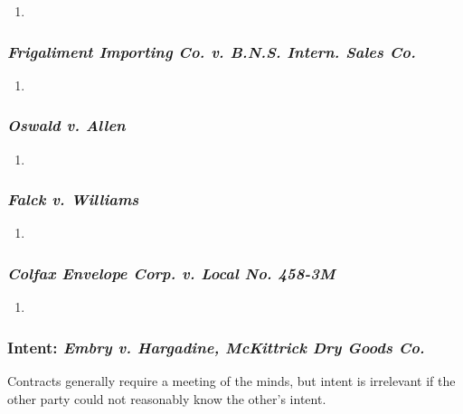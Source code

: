 \begin{enumerate}
    \item %
\end{enumerate}

\subsubsection{\emph{Frigaliment Importing Co. v. B.N.S. Intern. Sales Co.}}

\begin{enumerate}
    \item %
\end{enumerate}

\subsubsection{\emph{Oswald v. Allen}}

\begin{enumerate}
    \item %
\end{enumerate}

\subsubsection{\emph{Falck v. Williams}}

\begin{enumerate}
    \item %
\end{enumerate}

\subsubsection{\emph{Colfax Envelope Corp. v. Local No. 458-3M}}

\begin{enumerate}
    \item %
\end{enumerate}

\subsubsection{Intent: \emph{Embry v. Hargadine, McKittrick Dry Goods Co.}}

Contracts generally require a meeting of the minds, but intent is irrelevant 
if the other party could not reasonably know the other's intent.

